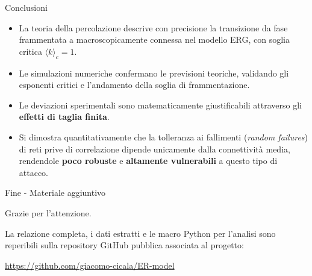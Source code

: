 \documentclass[italian]{beamer}
\begin{document}
\begin{frame}{Conclusioni}
    \begin{itemize}
        \item La teoria della percolazione descrive con precisione la transizione da fase frammentata a macroscopicamente connessa nel modello ERG, con soglia critica $\langle k \rangle_c = 1$.
        \item Le simulazioni numeriche confermano le previsioni teoriche, validando gli esponenti critici e l'andamento della soglia di frammentazione.
        \item Le deviazioni sperimentali sono matematicamente giustificabili attraverso gli \textbf{effetti di taglia finita}.
        \item Si dimostra quantitativamente che la tolleranza ai fallimenti (\emph{random failures}) di reti prive di correlazione dipende unicamente dalla connettività media, rendendole \textbf{poco robuste} e \textbf{altamente vulnerabili} a questo tipo di attacco.
    \end{itemize}
\end{frame}

\begin{frame}[b]{Fine - Materiale aggiuntivo}
    \Large\centerline{Grazie per l'attenzione.}

    \vspace{8em}

    \small
    La relazione completa, i dati estratti e le macro Python per l'analisi sono reperibili sulla repository GitHub pubblica associata al progetto:

    \url{https://github.com/giacomo-cicala/ER-model}
\end{frame}
\end{document}
